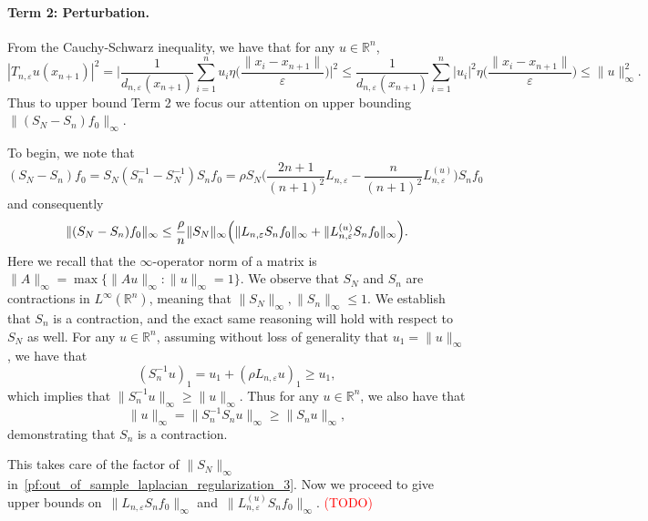 \documentclass{article}
\newcommand{\Reals}{\mathbb{R}}
\newcommand{\1}{\mathbf{1}}
\theoremstyle{alden}
\theoremstyle{aldenthm}
\theoremstyle{definition}
\theoremstyle{remark}
\begin{document}
\paragraph{Term 2: Perturbation.}
From the Cauchy-Schwarz inequality, we have that for any $u \in \Reals^n$,
\begin{equation*}
|T_{n,\varepsilon}u(x_{n + 1})|^2 = \biggl|\frac{1}{d_{n,\varepsilon}(x_{n + 1})} \sum_{i = 1}^{n} u_i \eta\biggl(\frac{\|x_i - x_{n + 1}\|}{\varepsilon}\biggr)\biggr|^2 \leq \frac{1}{d_{n,\varepsilon}(x_{n + 1})} \sum_{i = 1}^{n} |u_i|^2 \eta\biggl(\frac{\|x_{i} - x_{n + 1}\|}{\varepsilon}\biggr) \leq \|u\|_{\infty}^2.
\end{equation*}
Thus to upper bound Term 2 we focus our attention on upper bounding $\|(S_N - S_n)f_0\|_{\infty}$. 

To begin, we note that
\begin{equation*}
(S_N - S_n)f_0 = S_N(S_n^{-1} - S_N^{-1})S_nf_0 = \rho S_N\biggl(\frac{2n + 1}{(n + 1)^2}L_{n,\varepsilon} - \frac{n}{(n + 1)^2}L_{n,\varepsilon}^{(u)}\biggr)S_nf_0
\end{equation*}
and consequently
\begin{equation}
\label{pf:out_of_sample_laplacian_regularization_3}
\|(S_N - S_n)f_0\|_{\infty} \leq \frac{\rho}{n}\|S_N\|_{\infty}\Bigl(\|L_{n,\varepsilon}S_nf_0\|_{\infty} + \|L_{n,\varepsilon}^{(u)}S_nf_0\|_{\infty}\Bigr).
\end{equation}
Here we recall that the $\infty$-operator norm of a matrix is $\|A\|_{\infty} = \max\{\|Au\|_{\infty}:\|u\|_{\infty} = 1\}$. We observe that $S_N$ and $S_n$ are contractions in $L^{\infty}(\Reals^n)$, meaning that $\|S_N\|_{\infty},\|S_n\|_{\infty} \leq 1$. We establish that $S_n$ is a contraction, and the exact same reasoning will hold with respect to $S_N$ as well. For any $u \in \Reals^n$, assuming without loss of generality that $u_1 = \|u\|_{\infty}$, we have that
\begin{equation*}
(S_n^{-1}u)_1 = u_1 + (\rho L_{n,\varepsilon}u)_1 \geq u_1,
\end{equation*}
which implies that $\|S_n^{-1}u\|_{\infty} \geq \|u\|_{\infty}$. Thus for any $u \in \Reals^n$, we also have that
\begin{equation*}
\|u\|_{\infty} = \|S_n^{-1}S_nu\|_{\infty} \geq \|S_nu\|_{\infty},
\end{equation*}
demonstrating that $S_n$ is a contraction. 

This takes care of the factor of $\|S_N\|_{\infty}$ in~\eqref{pf:out_of_sample_laplacian_regularization_3}. Now we proceed to give upper bounds on~$\|L_{n,\varepsilon}S_nf_0\|_{\infty}$ and~$\|L_{n,\varepsilon}^{(u)}S_nf_0\|_{\infty}$.
\textcolor{red}{(TODO)} 
\end{document}

